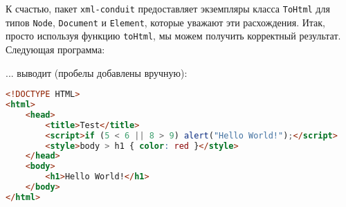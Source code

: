 К счастью, пакет \lstinline!xml-conduit! предоставляет экземпляры класса \lstinline!ToHtml! для типов \lstinline!Node!, \lstinline!Document! и \lstinline!Element!, которые уважают эти расхождения. Итак, просто используя функцию \lstinline!toHtml!, мы можем получить корректный результат. Следующая программа:


... выводит (пробелы добавлены вручную):

\begin{lstlisting}[language=HTML]
<!DOCTYPE HTML>
<html>
    <head>
        <title>Test</title>
        <script>if (5 < 6 || 8 > 9) alert("Hello World!");</script>
        <style>body > h1 { color: red }</style>
    </head>
    <body>
        <h1>Hello World!</h1>
    </body>
</html>
\end{lstlisting}%
